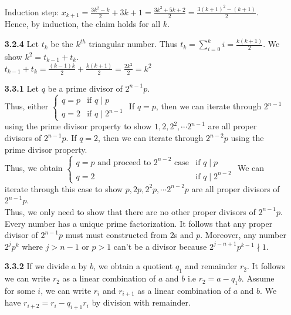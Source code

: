 \documentclass[10pt]{article}
\begin{document}
\begin{enumerate}
    Induction step: $x_{k+1}=\frac{3k^2-k}{2}+3k+1=\frac{3k^2+5k+2}{2}=\frac{3{(k+1)}^2-(k+1)}{2}$.\\
    Hence, by induction, the claim holds for all $k$.
    \item [\textbf{3.2.4}] Let $t_k$ be the $k^{th}$ triangular number. 
    Thus $t_k=\sum_{i=0}^{k}i=\frac{k(k+1)}{2}$.
    We show $k^2=t_{k-1}+t_k$.\\
    $t_{k-1}+t_k=\frac{(k-1)k}{2}+\frac{k(k+1)}{2}=\frac{2k^2}{2}=k^2$
    \item [\textbf{3.3.1}] Let $q$ be a prime divisor of $2^{n-1}p$.\\ 
    Thus, either $\begin{cases}
        q=p & \text{if } q\mid p\\
        q=2 & \text{if } q\mid 2^{n-1}
    \end{cases}$ 
    If $q=p$, then we can iterate through $2^{n-1}$ using the prime divisor property to show $1,2,2^2,\cdots 2^{n-1}$ are all proper divisors of $2^{n-1}p$.
    If $q=2$, then we can iterate through $2^{n-2}p$ using the prime divisor property.\\
    Thus, we obtain $\begin{cases}
        q=p \text{ and proceed to }2^{n-2}\text{ case} & \text{if } q\mid p\\
        q=2 & \text{if } q\mid 2^{n-2}
    \end{cases}$
    We can iterate through this case to show $p,2p,2^2p,\cdots 2^{n-2}p$ are all proper divisors of $2^{n-1}p$.\\
    Thus, we only need to show that there are no other proper divisors of $2^{n-1}p$. 
    Every number has a unique prime factorization. 
    It follows that any proper divisor of $2^{n-1}p$ must must constructed from $2$s and $p$.
    Moreover, any number $2^j p^k$ where $j>n-1$ or $p>1$ can't be a divisor because $2^{j-n+1}p^{k-1}\nmid 1$.
    \item [\textbf{3.3.2}] If we divide $a$ by $b$, we obtain a quotient $q_1$ and remainder $r_2$.
    It follows we can write $r_2$ as a linear combination of $a$ and $b$ i.e $r_2=a-q_1b$.
    Assume for some $i$, we can write $r_i$ and $r_{i+1}$ as a linear combination of $a$ and $b$.
    We have $r_{i+2}=r_i-q_{i+1}r_i$ by division with remainder. 

\end{enumerate}
\end{document}
